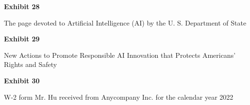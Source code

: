 \documentclass{article}
\begin{document}
% 




\vspace*{\fill}
\begin{center}

{\LARGE \bf
Exhibit 28
}

\vspace{10\baselineskip}

{\large The page devoted to Artificial Intelligence (AI) by the U. S. Department of State}

\end{center}
\vspace*{\fill}






\vspace*{\fill}
\begin{center}

{\LARGE \bf
Exhibit 29
}

\vspace{10\baselineskip}

{\large New Actions to Promote Responsible AI Innovation that Protects Americans’ Rights and Safety}

\end{center}
\vspace*{\fill}






\vspace*{\fill}
\begin{center}

{\LARGE \bf
Exhibit 30
}

\vspace{10\baselineskip}

{\large W-2 form Mr. Hu received from Anycompany Inc. for the calendar year 2022}

\end{center}
\vspace*{\fill}

% 
\end{document}
